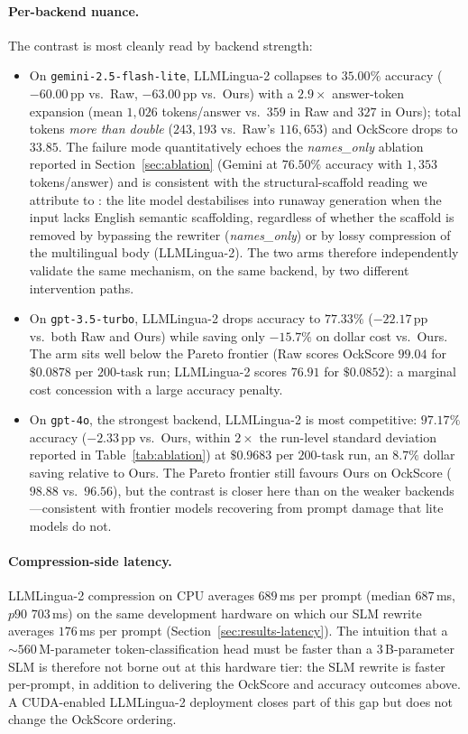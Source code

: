 \documentclass[11pt,a4paper,twocolumn]{article}
\begin{document}
\paragraph{Per-backend nuance.} The contrast is most cleanly read by backend strength:
\begin{itemize}
    \item On \texttt{gemini-2.5-flash-lite}, LLMLingua-2 collapses to $35.00\%$ accuracy ($-60.00$\,pp vs.\ Raw, $-63.00$\,pp vs.\ Ours) with a $2.9\times$ answer-token expansion (mean $1{,}026$ tokens/answer vs.\ $359$ in Raw and $327$ in Ours); total tokens \emph{more than double} ($243{,}193$ vs.\ Raw's $116{,}653$) and OckScore drops to $33.85$. The failure mode quantitatively echoes the \textit{names\_only} ablation reported in Section~\ref{sec:ablation} (Gemini at $76.50\%$ accuracy with $1{,}353$ tokens/answer) and is consistent with the structural-scaffold reading we attribute to \cite{ma2025sketch}: the lite model destabilises into runaway generation when the input lacks English semantic scaffolding, regardless of whether the scaffold is removed by bypassing the rewriter (\textit{names\_only}) or by lossy compression of the multilingual body (LLMLingua-2). The two arms therefore independently validate the same mechanism, on the same backend, by two different intervention paths.
    \item On \texttt{gpt-3.5-turbo}, LLMLingua-2 drops accuracy to $77.33\%$ ($-22.17$\,pp vs.\ both Raw and Ours) while saving only $-15.7\%$ on dollar cost vs.\ Ours. The arm sits well below the Pareto frontier (Raw scores OckScore $99.04$ for $\$0.0878$ per $200$-task run; LLMLingua-2 scores $76.91$ for $\$0.0852$): a marginal cost concession with a large accuracy penalty.
    \item On \texttt{gpt-4o}, the strongest backend, LLMLingua-2 is most competitive: $97.17\%$ accuracy ($-2.33$\,pp vs.\ Ours, within $2\times$ the run-level standard deviation reported in Table~\ref{tab:ablation}) at $\$0.9683$ per $200$-task run, an $8.7\%$ dollar saving relative to Ours. The Pareto frontier still favours Ours on OckScore ($98.88$ vs.\ $96.56$), but the contrast is closer here than on the weaker backends---consistent with frontier models recovering from prompt damage that lite models do not.
\end{itemize}

\paragraph{Compression-side latency.} LLMLingua-2 compression on CPU averages $689$\,ms per prompt (median $687$\,ms, $p90$ $703$\,ms) on the same development hardware on which our SLM rewrite averages $176$\,ms per prompt (Section~\ref{sec:results-latency}). The intuition that a $\sim\!560$\,M-parameter token-classification head must be faster than a $3$\,B-parameter SLM is therefore not borne out at this hardware tier: the SLM rewrite is faster per-prompt, in addition to delivering the OckScore and accuracy outcomes above. A CUDA-enabled LLMLingua-2 deployment closes part of this gap but does not change the OckScore ordering.
\end{document}
